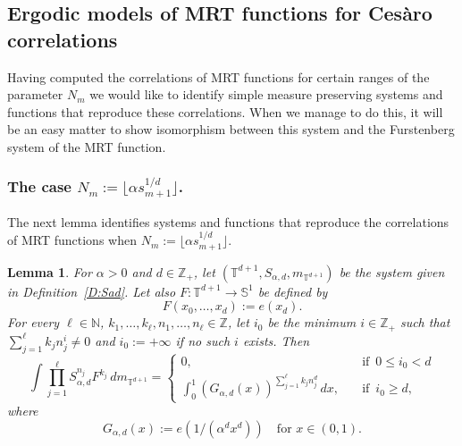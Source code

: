 \documentclass[11pt]{amsart}
\newtheorem{lemma}{Lemma}[section]
\theoremstyle{definition}
\newcommand{\N}{{\mathbb N}}
\newcommand{\R}{{\mathbb R}}
\renewcommand{\S}{\mathbb{S}}
\newcommand{\T}{{\mathbb T}}
\newcommand{\Z}{{\mathbb Z}}
\begin{document}
 \subsection{Ergodic models of MRT functions for Ces\`aro correlations}\label{SS:ergmod1}
 Having computed the correlations of MRT functions for certain ranges of the parameter $N_m$ we would like to identify simple measure preserving systems and functions that reproduce these correlations. When we manage to do this, it will be an easy matter to show isomorphism between this system and the Furstenberg system of the MRT function.
 \subsubsection{The case  $N_m:=\lfloor\alpha s_{m+1}^{1/d}\rfloor$.}
 The next lemma identifies systems and functions that reproduce the correlations of MRT functions when $N_m:=\lfloor\alpha s_{m+1}^{1/d}\rfloor$.
 \begin{lemma}\label{L:corrF}
 		For  $\alpha>0$ and $d\in \Z_+$, let
 	$(\T^{d+1}, S_{\alpha,d},m_{\T^{d+1}})$ be the  system given in Definition~\ref{D:Sad}.
 	 	Let also $F\colon \T^{d+1}\to \S^1$ be defined by
 	$$
 	F(x_0,\ldots, x_d):=e(x_d).
 	$$
 For every $\ell\in\N$, $k_1,\ldots, k_\ell, n_1,\ldots, n_\ell \in \Z$,
 let  $i_0$ be the minimum $i\in \Z_+$
 such that $\sum_{j=1}^\ell k_j n_j^i\neq  0$ and $i_0:=+\infty$ if no such   $i$ exists.
 Then 	
 \begin{equation}\label{E:Gad}
 \int \prod_{j=1}^\ell S_{\alpha,d}^{n_j}F^{k_j}\, dm_{\T^{d+1}}=
 \begin{cases}
 	0, & \quad \text{if }\,  0\leq i_0<d\\
 	\int_0^1 (G_{\alpha,d}(x))^{\sum_{j=1}^\ell k_jn_j^d} \, dx, & \quad \text{if } \, i_0\geq d,
 \end{cases}
 \end{equation}
 where
 $$
 G_{\alpha,d}(x):=e(1/(\alpha^d x^d)) \quad  \text{for } x\in (0,1).
 $$
 \end{lemma}
\end{document}
